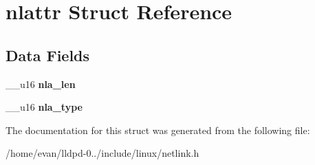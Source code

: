\section{nlattr \-Struct \-Reference}
\label{structnlattr}
\subsection*{\-Data \-Fields}
\begin{DoxyCompactItemize}
\item 
\-\_\-\-\_\-u16 {\bfseries nla\-\_\-len}\label{structnlattr_ab1fbf4f4f62d31f2e2df15e8ba1030d3}

\item 
\-\_\-\-\_\-u16 {\bfseries nla\-\_\-type}\label{structnlattr_a0eba1731153bd53a190d564120cfff6b}

\end{DoxyCompactItemize}


\-The documentation for this struct was generated from the following file\-:\begin{DoxyCompactItemize}
\item 
/home/evan/lldpd-\/0../include/linux/netlink.\-h\end{DoxyCompactItemize}
